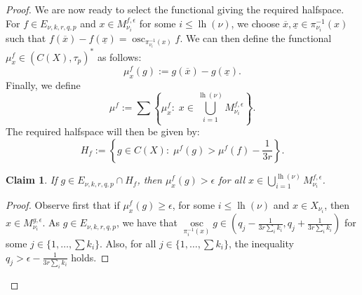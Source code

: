 \documentclass[10pt,a4paper]{amsart}
\newtheorem{claim}{Claim}
\DeclareMathOperator{\osc}{osc}
\DeclareMathOperator{\lgth}{lh}
\begin{document}
\begin{proof}
	We are now ready to select the functional giving the required halfspace. For $f \in E_{\nu,k,r,q,p}$ and $x \in M^{f, \epsilon}_{\nu_i}$ for some $i \leq \lgth(\nu)$, we choose $\overline{x}, \underline{x} \in \pi_{\nu_i}^{-1} (x)$ such that $f(\overline{x}) - f(\underline{x}) = \osc_{\pi_{\nu_i}^{-1}(x)} f$. We can then define the functional $\mu^f_x \in \left(C(X), \tau_p\right)^*$ as follows:
	\begin{equation*}
		\mu^f_x(g) := g(\overline{x}) - g(\underline{x}).
	\end{equation*}
	Finally, we define
	\begin{equation*}
		\mu^f := \sum \left\{\mu^f_x : \; x \in \bigcup\limits_{i = 1}^{\lgth(\nu)} M^{f, \epsilon}_{\nu_i} \right\}.
	\end{equation*}
	The required halfspace will then be given by:
	\begin{equation}
		H_f := \left\{g \in C(X): \; \mu^f (g) > \mu^f (f) - \frac{1}{3r}\right\}.
	\end{equation}
	
	\begin{claim}
		If $g \in E_{\nu,k,r,q,p} \cap H_f$, then $\mu^f_x(g) > \epsilon$ for all $x \in \bigcup_{i = 1}^{\lgth(\nu)} M^{f, \epsilon}_{\nu_i} $.
	\end{claim}
	
	\begin{proof}
		Observe first that if $\mu^f_x (g) \geq \epsilon$, for some $i \leq \lgth(\nu)$ and $x \in X_{\nu_i}$, then $x \in M^{g,\epsilon}_{\nu_i}$. As $g \in E_{\nu,k,r,q,p}$, we have that $\osc\limits_{\pi_i^{-1}(x)} g \in \left(q_j - \frac{1}{3 r \sum_i k_i}, q_j + \frac{1}{3 r \sum_i k_i}\right)$ for some $j \in \{1, \dots, \sum k_i\}$. Also, for all $j \in \{1, \dots, \sum k_i\}$, the inequality $q_j > \epsilon  - \frac{1}{3 r \sum_i k_i}$ holds.
		

\end{proof}
\end{proof}
\end{document}
